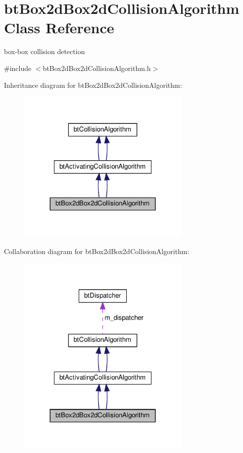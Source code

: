 \hypertarget{classbtBox2dBox2dCollisionAlgorithm}{}\section{bt\+Box2d\+Box2d\+Collision\+Algorithm Class Reference}
\label{classbtBox2dBox2dCollisionAlgorithm}


box-\/box collision detection  




{\ttfamily \#include $<$bt\+Box2d\+Box2d\+Collision\+Algorithm.\+h$>$}



Inheritance diagram for bt\+Box2d\+Box2d\+Collision\+Algorithm\+:
\nopagebreak
\begin{figure}[H]
\begin{center}
\leavevmode
\includegraphics[width=239pt]{classbtBox2dBox2dCollisionAlgorithm__inherit__graph}
\end{center}
\end{figure}


Collaboration diagram for bt\+Box2d\+Box2d\+Collision\+Algorithm\+:
\nopagebreak
\begin{figure}[H]
\begin{center}
\leavevmode
\includegraphics[width=239pt]{classbtBox2dBox2dCollisionAlgorithm__coll__graph}
\end{center}
\end{figure}
